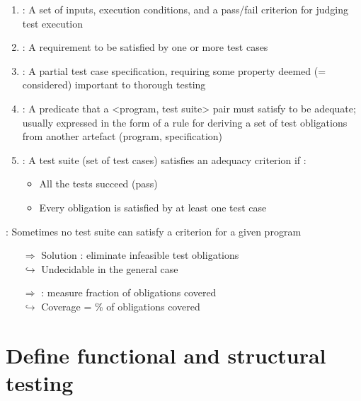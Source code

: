 \begin{enumerate}
    \item {} : A set of inputs, execution conditions, and a pass/fail criterion for judging test execution
    \item {} : A requirement to be satisfied by one or more test cases
    \item {} : A partial test case specification, requiring some property deemed (= considered) important to thorough testing
    \item {}: A predicate that a <program, test suite> pair must satisfy to be adequate; usually expressed in the form of a rule for deriving a set of test obligations from another artefact (program, specification)
    \item {}:
    A test suite (set of test cases) satisfies an adequacy criterion if :
    \begin{itemize}
        \item All the tests succeed (pass)
        \item Every obligation is satisfied by at least one test case
    \end{itemize}
\end{enumerate}

: Sometimes no test suite can satisfy a criterion for a given program
\begin{itemize}
    \item [$\Rightarrow$] Solution : eliminate infeasible test obligations\\
    $\hookrightarrow$ Undecidable in the general case
    \item [$\Rightarrow$] : measure fraction of obligations covered\\
    $\hookrightarrow$ Coverage = \% of obligations covered
\end{itemize}

\section{Define functional and structural testing}

